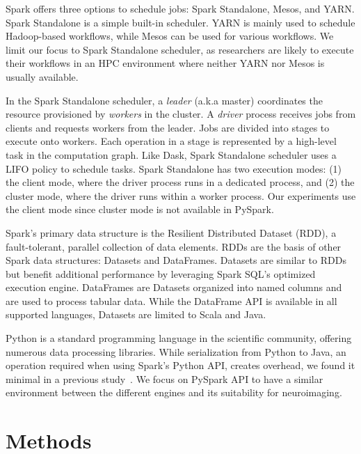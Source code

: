 \documentclass[AMA,STIX1COL]{WileyNJD-v2}
\begin{document}
Spark offers three options to schedule jobs: Spark Standalone, Mesos, and YARN.
Spark Standalone is a simple built-in scheduler.
YARN is mainly used to schedule Hadoop-based workflows, while Mesos can be used for various workflows.
We limit our focus to Spark Standalone scheduler, as researchers are likely to 
execute their workflows in an HPC environment where neither YARN nor Mesos is usually available.
				
In the Spark Standalone scheduler, a \textit{leader} (a.k.a master) coordinates the resource provisioned by \textit{workers} in the cluster.
A \textit{driver}  process receives jobs from clients and requests workers from the leader.
Jobs are divided into stages to execute onto workers.
Each operation in a stage is represented by a high-level task in the computation graph.
Like Dask, Spark Standalone scheduler uses a LIFO policy to schedule tasks.
Spark Standalone has two execution modes: (1) the client mode, where the driver process runs in a dedicated process,
and (2) the cluster mode, where the driver runs within a worker process.
Our experiments use the client mode since cluster mode is not available in PySpark.
				
Spark's primary data structure is the Resilient Distributed Dataset (RDD)\cite{RDD}, a fault-tolerant, parallel collection of data elements.
RDDs are the basis of other Spark data structures: Datasets and DataFrames.
Datasets are similar to RDDs but benefit additional performance by leveraging Spark SQL's optimized execution engine. 
DataFrames are Datasets organized into named columns and are used to process tabular data. 
While the DataFrame API is available in all supported languages, Datasets are limited to Scala and Java. 
				
Python is a standard programming language in the scientific community, offering numerous data processing libraries.
While serialization from Python to Java, an operation required when using Spark's Python API, creates overhead, we found it minimal in a previous study~\cite{8943502}.
We focus on PySpark API to have a similar environment between the different engines and  its suitability for neuroimaging.
				
\section{Methods}
\end{document}
